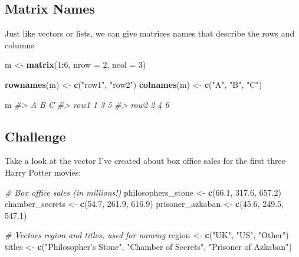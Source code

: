 \documentclass[]{book}
\newenvironment{Shaded}{\begin{snugshade}}{\end{snugshade}}
\newcommand{\KeywordTok}[1]{\textcolor[rgb]{0.13,0.29,0.53}{\textbf{#1}}}
\newcommand{\DataTypeTok}[1]{\textcolor[rgb]{0.13,0.29,0.53}{#1}}
\newcommand{\DecValTok}[1]{\textcolor[rgb]{0.00,0.00,0.81}{#1}}
\newcommand{\FloatTok}[1]{\textcolor[rgb]{0.00,0.00,0.81}{#1}}
\newcommand{\StringTok}[1]{\textcolor[rgb]{0.31,0.60,0.02}{#1}}
\newcommand{\CommentTok}[1]{\textcolor[rgb]{0.56,0.35,0.01}{\textit{#1}}}
\newcommand{\OperatorTok}[1]{\textcolor[rgb]{0.81,0.36,0.00}{\textbf{#1}}}
\newcommand{\NormalTok}[1]{#1}
\begin{document}
\subsection{Matrix Names}\label{matrix-names}

Just like vectors or lists, we can give matrices names that describe the
rows and columns

\begin{Shaded}
\begin{Highlighting}[]
\NormalTok{m <-}\StringTok{ }\KeywordTok{matrix}\NormalTok{(}\DecValTok{1}\OperatorTok{:}\DecValTok{6}\NormalTok{, }\DataTypeTok{nrow =} \DecValTok{2}\NormalTok{, }\DataTypeTok{ncol =} \DecValTok{3}\NormalTok{)}

\KeywordTok{rownames}\NormalTok{(m) <-}\StringTok{ }\KeywordTok{c}\NormalTok{(}\StringTok{"row1"}\NormalTok{, }\StringTok{"row2"}\NormalTok{)}
\KeywordTok{colnames}\NormalTok{(m) <-}\StringTok{ }\KeywordTok{c}\NormalTok{(}\StringTok{"A"}\NormalTok{, }\StringTok{"B"}\NormalTok{, }\StringTok{"C"}\NormalTok{)}

\NormalTok{m}
\CommentTok{#>      A B C}
\CommentTok{#> row1 1 3 5}
\CommentTok{#> row2 2 4 6}
\end{Highlighting}
\end{Shaded}

\subsection{Challenge}\label{challenge}

Take a look at the vector I've created about box office sales for the
first three Harry Potter movies:

\begin{Shaded}
\begin{Highlighting}[]
\CommentTok{# Box office sales (in millions!)}
\NormalTok{philosophers_stone <-}\StringTok{ }\KeywordTok{c}\NormalTok{(}\FloatTok{66.1}\NormalTok{, }\FloatTok{317.6}\NormalTok{, }\FloatTok{657.2}\NormalTok{)}
\NormalTok{chamber_secrets <-}\StringTok{ }\KeywordTok{c}\NormalTok{(}\FloatTok{54.7}\NormalTok{, }\FloatTok{261.9}\NormalTok{, }\FloatTok{616.9}\NormalTok{)}
\NormalTok{prisoner_azkaban <-}\StringTok{ }\KeywordTok{c}\NormalTok{(}\FloatTok{45.6}\NormalTok{, }\FloatTok{249.5}\NormalTok{, }\FloatTok{547.1}\NormalTok{)}

\CommentTok{# Vectors region and titles, used for naming}
\NormalTok{region <-}\StringTok{ }\KeywordTok{c}\NormalTok{(}\StringTok{"UK"}\NormalTok{, }\StringTok{"US"}\NormalTok{, }\StringTok{"Other"}\NormalTok{)}
\NormalTok{titles <-}\StringTok{ }\KeywordTok{c}\NormalTok{(}\StringTok{"Philosopher's Stone"}\NormalTok{, }\StringTok{"Chamber of Secrets"}\NormalTok{, }\StringTok{"Prisoner of Azkaban"}\NormalTok{)}
\end{Highlighting}
\end{Shaded}
\end{document}
